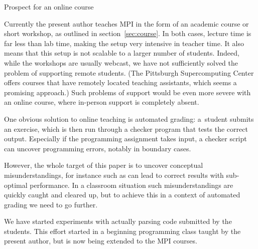 \begin{comment}
  \Level 2 {Evaluation and supervision}

  In our academic class the programming exercises are done partly in
  class and partly as homework. They are very lightly
  graded: the majority of the grade comes from a programming project
  that is the student's own initiative and coded from scratch.

  In the workshop format there is no grading, but the instructor plus
  possible assistants are continuously monitoring students to help them
  over stumbling blocks and clarify concepts, both in MPI and elementary
  programming. We have found that one instructor or assistant per 8--10
  students is a good ratio; more students per instructor will have
  students fall by the wayside. The typical exercise takes 15--30 minutes.
\end{comment}

 {Prospect for an online course}
\label{sec:online}

Currently the present author teaches MPI in the form of an academic
course or short workshop, as outlined in section~\ref{sec:course}.
In both cases, lecture time is far less than lab time, making the
setup very intensive in teacher time. It also means that this setup is
not scalable to a larger number of students. Indeed, while the
workshops are usually webcast, we have not sufficiently solved the
problem of supporting remote students. (The Pittsburgh Supercomputing
Center offers courses that have remotely located teaching assistants,
which seems a promising approach.)
Such problems of support would be even more severe with an online
course, where in-person support is completely absent.

One obvious solution to online teaching is automated grading:
a~student submits an exercise, which is then run through a checker
program that tests the correct output. Especially if the programming
assignment takes input, a checker script can uncover programming
errors, notably in boundary cases.

However, the whole target of this paper is to uncover conceptual
misunderstandings, for instance such as can lead to correct results
with sub-optimal performance. In a classroom situation such
misunderstandings are quickly caught and cleared up, but to achieve
this in a context of automated grading we need to go further.

We have started experiments with actually parsing code submitted by
the students. This effort started in a beginning programming class
taught by the present author, but is now being extended to the MPI courses.

